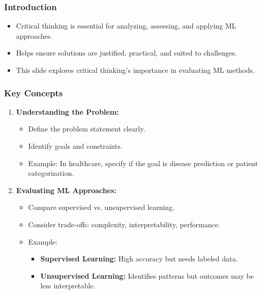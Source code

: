 \documentclass[aspectratio=169]{beamer}
\begin{document}
\begin{frame}[fragile]
    \frametitle{Introduction}
    \begin{itemize}
        \item Critical thinking is essential for analyzing, assessing, and applying ML approaches.
        \item Helps ensure solutions are justified, practical, and suited to challenges.
        \item This slide explores critical thinking's importance in evaluating ML methods.
    \end{itemize}
\end{frame}

\begin{frame}[fragile]
    \frametitle{Key Concepts}
    \begin{enumerate}
        \item \textbf{Understanding the Problem:}
        \begin{itemize}
            \item Define the problem statement clearly.
            \item Identify goals and constraints.
            \item Example: In healthcare, specify if the goal is disease prediction or patient categorization.
        \end{itemize}

        \item \textbf{Evaluating ML Approaches:}
        \begin{itemize}
            \item Compare supervised vs. unsupervised learning.
            \item Consider trade-offs: complexity, interpretability, performance.
            \item Example: 
                \begin{itemize}
                    \item \textbf{Supervised Learning:} High accuracy but needs labeled data.
                    \item \textbf{Unsupervised Learning:} Identifies patterns but outcomes may be less interpretable.
                \end{itemize}
        \end{itemize}
    \end{enumerate}
\end{frame}
\end{document}
